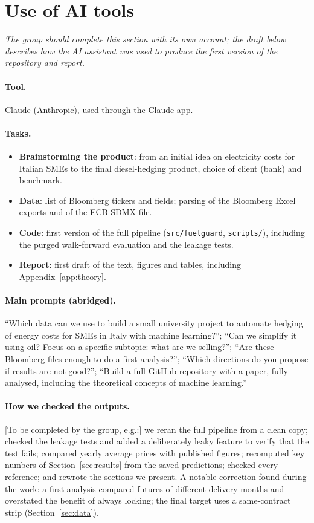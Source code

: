 \section{Use of AI tools}\label{app:ai}

\emph{The group should complete this section with its own account; the draft below describes how the
AI assistant was used to produce the first version of the repository and report.}

\paragraph{Tool.} Claude (Anthropic), used through the Claude app.

\paragraph{Tasks.}
\begin{itemize}
\item \textbf{Brainstorming the product}: from an initial idea on electricity costs for Italian SMEs to
the final diesel-hedging product, choice of client (bank) and benchmark.
\item \textbf{Data}: list of Bloomberg tickers and fields; parsing of the Bloomberg Excel exports and of
the ECB SDMX file.
\item \textbf{Code}: first version of the full pipeline (\texttt{src/fuelguard}, \texttt{scripts/}),
including the purged walk-forward evaluation and the leakage tests.
\item \textbf{Report}: first draft of the text, figures and tables, including Appendix~\ref{app:theory}.
\end{itemize}

\paragraph{Main prompts (abridged).} ``Which data can we use to build a small university project to
automate hedging of energy costs for SMEs in Italy with machine learning?''; ``Can we simplify it using oil?
Focus on a specific subtopic: what are we selling?''; ``Are these Bloomberg files enough to do a first
analysis?''; ``Which directions do you propose if results are not good?''; ``Build a full GitHub repository
with a paper, fully analysed, including the theoretical concepts of machine learning.''

\paragraph{How we checked the outputs.} [To be completed by the group, e.g.:] we reran the full pipeline
from a clean copy; checked the leakage tests and added a deliberately leaky feature to verify that the test
fails; compared yearly average prices with published figures; recomputed key numbers of Section~\ref{sec:results}
from the saved predictions; checked every reference; and rewrote the sections we present.
A notable correction found during the work: a first analysis compared futures of different delivery months
and overstated the benefit of always locking; the final target uses a same-contract strip
(Section~\ref{sec:data}).
